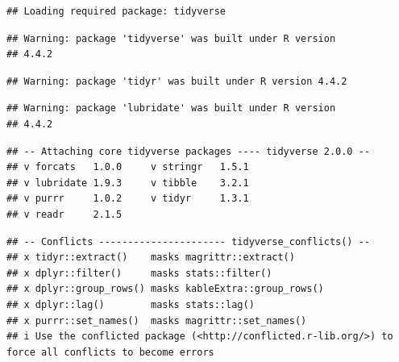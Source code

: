 \documentclass[french,]{compterendu}
\theoremstyle{urcastyle}
\theoremstyle{remark}
\begin{document}
\begin{verbatim}
## Loading required package: tidyverse
\end{verbatim}

\begin{verbatim}
## Warning: package 'tidyverse' was built under R version
## 4.4.2
\end{verbatim}

\begin{verbatim}
## Warning: package 'tidyr' was built under R version 4.4.2
\end{verbatim}

\begin{verbatim}
## Warning: package 'lubridate' was built under R version
## 4.4.2
\end{verbatim}

\begin{verbatim}
## -- Attaching core tidyverse packages ---- tidyverse 2.0.0 --
## v forcats   1.0.0     v stringr   1.5.1
## v lubridate 1.9.3     v tibble    3.2.1
## v purrr     1.0.2     v tidyr     1.3.1
## v readr     2.1.5
\end{verbatim}

\begin{verbatim}
## -- Conflicts ---------------------- tidyverse_conflicts() --
## x tidyr::extract()    masks magrittr::extract()
## x dplyr::filter()     masks stats::filter()
## x dplyr::group_rows() masks kableExtra::group_rows()
## x dplyr::lag()        masks stats::lag()
## x purrr::set_names()  masks magrittr::set_names()
## i Use the conflicted package (<http://conflicted.r-lib.org/>) to force all conflicts to become errors
\end{verbatim}
\end{document}
